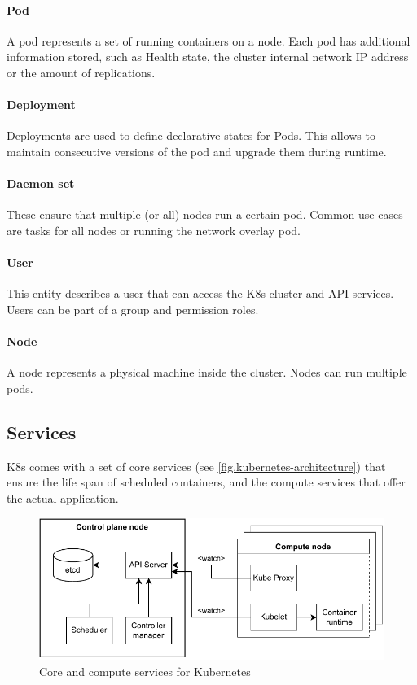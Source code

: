 \paragraph*{Pod} A pod represents a set of running containers on a node. Each pod has additional information stored, such as Health state, the cluster internal network \ac{IP} address or the amount of replications.
\paragraph*{Deployment}
Deployments are used to define declarative states for Pods. This allows to maintain consecutive versions of the pod and upgrade them during runtime.
\paragraph*{Daemon set} These ensure that multiple (or all) nodes run a certain pod\cite{Kubernetes.20220831}. Common use cases are tasks for all nodes or running the network overlay pod.
\paragraph*{User} This entity describes a user that  can access the \ac{K8s} cluster and \ac{API} services. Users can be part of a group and permission roles.
\paragraph*{Node} A node represents a physical machine inside the cluster. Nodes can run multiple pods.


\subsection{Services}
\ac{K8s} comes with a set of core services (see \autoref{fig.kubernetes-architecture}) that ensure the life span of scheduled containers, and the compute services that offer the actual application.
\begin{figure}[h]
	\centering
	\includegraphics[width=.95\textwidth]{Figures/kubernetes-architecture.pdf}
	\caption{Core and compute services for Kubernetes\cite{Luksa.2018}}
	\label{fig.kubernetes-architecture}
\end{figure}

